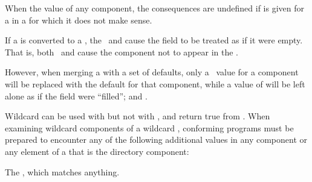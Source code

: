 When  the value of any  component,
the consequences are undefined if  is given 
for a  in a  for which it does not make sense.



If a  is converted to a , 
the  \nil\ and 
cause the field to be treated as if it were empty.
That is,
both \nil\ and  
cause the component not to appear in the .

However, when merging a  with a set of defaults,
only a \nil\ value for a component 
will be replaced with the default for that component, 
while a value of 
will be left alone as if the field were ``filled'';
 and \secref\MergingPathnames.

\endsubsubsubsubsection%

\endsubsubsubsection%

\endsubsubsection%


  Wildcard  can be used with  but not with 
  ,
  and return true from . When examining
  wildcard components of a wildcard , conforming programs
  must be prepared to encounter any of the following additional values
  in any component or any element of a  that is the directory component:
 
\beginlist

\itemitem{\bull} The  , which matches anything.
 

